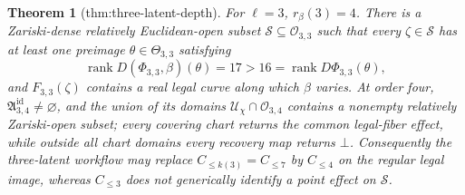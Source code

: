 \documentclass{article}
\newtheorem{theorem}{Theorem}
\begin{document}
\begin{theorem}[thm:three-latent-depth]\label{thm:three-latent-depth}
For \(\ell=3\), \(r_\beta(3)=4\).  There is a Zariski-dense relatively Euclidean-open subset \(\mathcal S\subseteq\mathcal O_{3,3}\) such that every \(\zeta\in\mathcal S\) has at least one preimage \(\theta\in\Theta_{3,3}\) satisfying
\[
 \operatorname{rank}D(\Phi_{3,3},\beta)(\theta)=17
 >16=\operatorname{rank}D\Phi_{3,3}(\theta),
\]
and \(F_{3,3}(\zeta)\) contains a real legal curve along which \(\beta\) varies.  At order four, \(\mathfrak A^{\mathrm{id}}_{3,4}\ne\varnothing\), and the union of its domains \(\mathcal U_\chi\cap\mathcal O_{3,4}\) contains a nonempty relatively Zariski-open subset; every covering chart returns the common legal-fiber effect, while outside all chart domains every recovery map returns \(\bot\).  Consequently the three-latent workflow may replace \(C_{\le k(3)}=C_{\le7}\) by \(C_{\le4}\) on the regular legal image, whereas \(C_{\le3}\) does not generically identify a point effect on \(\mathcal S\).
\end{theorem}
\end{document}
